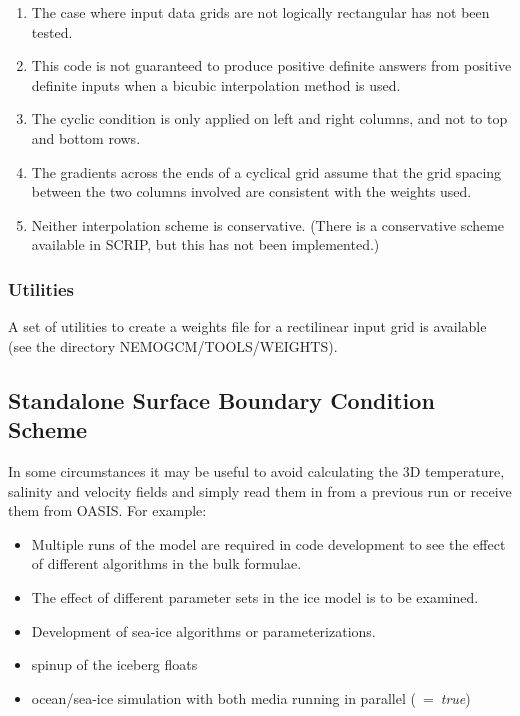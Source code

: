 \documentclass[NEMO_book]{subfiles}
\begin{document}
\begin{enumerate}  
\item  The case where input data grids are not logically rectangular has not been tested.
\item  This code is not guaranteed to produce positive definite answers from positive definite inputs
          when a bicubic interpolation method is used.
\item  The cyclic condition is only applied on left and right columns, and not to top and bottom rows.
\item  The gradients across the ends of a cyclical grid assume that the grid spacing between 
          the two columns involved are consistent with the weights used.
\item  Neither interpolation scheme is conservative. (There is a conservative scheme available 
          in SCRIP, but this has not been implemented.)
\end{enumerate}

\subsubsection{Utilities}
\label{SBC_iof_util}

A set of utilities to create a weights file for a rectilinear input grid is available 
(see the directory NEMOGCM/TOOLS/WEIGHTS).

\subsection [Standalone Surface Boundary Condition Scheme] {Standalone Surface Boundary Condition Scheme}
\label{SAS_iof}


In some circumstances it may be useful to avoid calculating the 3D temperature, salinity and velocity fields 
and simply read them in from a previous run or receive them from OASIS.  
For example:

\begin{itemize}
\item  Multiple runs of the model are required in code development to see the effect of different algorithms in
       the bulk formulae.
\item  The effect of different parameter sets in the ice model is to be examined.
\item  Development of sea-ice algorithms or parameterizations.
\item  spinup of the iceberg floats
\item  ocean/sea-ice simulation with both media running in parallel (~=~\textit{true})
\end{itemize}
\end{document}
